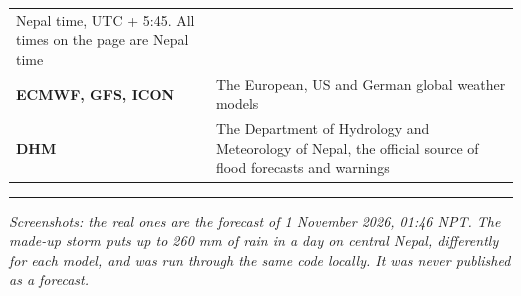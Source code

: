 \documentclass[
  10pt,
]{article}
\begin{document}
\begin{longtable}[]{@{}ll@{}}
\begin{minipage}[t]{0.47\columnwidth}
Nepal time, UTC + 5:45. All times on the page are Nepal time\strut
\end{minipage}\tabularnewline
\begin{minipage}[t]{0.47\columnwidth}\raggedright
\textbf{ECMWF, GFS, ICON}\strut
\end{minipage} & \begin{minipage}[t]{0.47\columnwidth}\raggedright
The European, US and German global weather models\strut
\end{minipage}\tabularnewline
\begin{minipage}[t]{0.47\columnwidth}\raggedright
\textbf{DHM}\strut
\end{minipage} & \begin{minipage}[t]{0.47\columnwidth}\raggedright
The Department of Hydrology and Meteorology of Nepal, the official
source of flood forecasts and warnings\strut
\end{minipage}\tabularnewline
\bottomrule
\end{longtable}

\begin{center}\rule{0.5\linewidth}{0.5pt}\end{center}

\emph{Screenshots: the real ones are the forecast of 1 November 2026,
01:46 NPT. The made-up storm puts up to 260 mm of rain in a day on
central Nepal, differently for each model, and was run through the same
code locally. It was never published as a forecast.}
\end{document}
